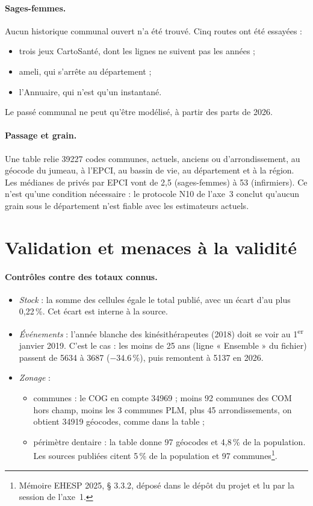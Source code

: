 \documentclass[11pt]{article}
\begin{document}
\paragraph{Sages-femmes.} Aucun historique communal ouvert n'a été trouvé. Cinq routes ont été essayées :
\begin{itemize}
  \item trois jeux CartoSanté, dont les lignes ne suivent pas les années ;
  \item ameli, qui s'arrête au département ;
  \item l'Annuaire, qui n'est qu'un instantané.
\end{itemize}
Le passé communal ne peut qu'être modélisé, à partir des parts de 2026.

\paragraph{Passage et grain.} Une table relie \num{39227} codes communes, actuels, anciens ou d'arrondissement,
au géocode du jumeau, à l'EPCI, au bassin de vie, au département et à la région. Les médianes de privés par EPCI
vont de 2,5 (sages-femmes) à 53 (infirmiers)\mesure{}. Ce n'est qu'une condition nécessaire : le protocole N10
de l'axe~3 conclut qu'aucun grain sous le département n'est fiable avec les estimateurs actuels.

\section{Validation et menaces à la validité}\label{sec:menaces}
\paragraph{Contrôles contre des totaux connus.}
\begin{itemize}
  \item \emph{Stock} : la somme des cellules égale le total publié, avec un écart d'au plus 0,22\,\%\mesure{}.
  Cet écart est interne à la source.
  \item \emph{Événements} : l'année blanche des kinésithérapeutes (2018) doit se voir au 1\textsuperscript{er}
  janvier 2019. C'est le cas : les moins de 25 ans (ligne « Ensemble » du fichier) passent de \num{5634} à \num{3687}
  (\num{-34.6}\,\%), puis remontent à \num{5137} en 2026\mesure{}.
  \item \emph{Zonage} :
  \begin{itemize}
    \item communes : le COG en compte \num{34969} ; moins 92 communes des COM hors champ, moins les 3 communes
    PLM, plus 45 arrondissements, on obtient \num{34919} géocodes, comme dans la table\mesure{} ;
    \item périmètre dentaire : la table donne 97 géocodes et 4,8\,\% de la population\mesure{}. Les sources
    publiées citent 5\,\% de la population \citep{arspaca2025cd} et 97 communes\footnote{Mémoire EHESP 2025,
    § 3.3.2, déposé dans le dépôt du projet et lu par la session de l'axe~1.}.
  \end{itemize}
\end{itemize}
\end{document}
